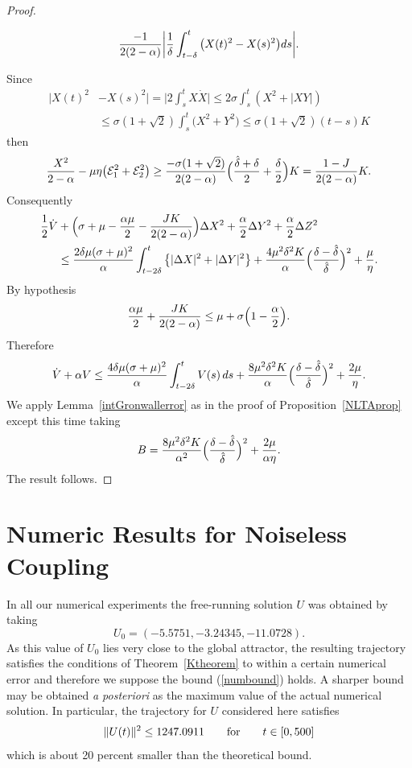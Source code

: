 \documentclass[master,tocprelim,12pt]{unrthesis}
\theoremstyle{definition}
\newcommand{\yourdelta}{{\Delta}}
\numberwithin{equation}{chapter}
\begin{document}
\begin{manuscript}
\begin{proof}
\begin{plain}
$${	{-1\over 2(2-\alpha)}
		\bigg| {1\over \delta}
			\int_{t-\delta}^t
				\big(X(t)^2-X(s)^2\big)ds\bigg|.
}$$\end{plain}%
Since 
\begin{align*}
	|X(t)^2&-X(s)^2|=\Big|2\int_s^t X\dot X\Big|
	\le 2\sigma \int_s^t (X^2+ |XY|)\\
	&
	\le \sigma (1+\sqrt 2)\int_s^t \big(X^2+ Y^2\big)
	\le \sigma (1+\sqrt 2)(t-s)K
\end{align*}
then
$$
	{X^2\over 2-\alpha}-\mu\eta
        \big({\cal E}_1^2+{\cal E}_2^2\big)
	\ge{-\sigma(1+\sqrt 2)\over 2(2-\alpha)}
    \Big({\hat\delta+\delta\over 2}+{\delta\over 2}\Big)K
	={1-J\over 2(2-\alpha)}K.
$$
Consequently
\begin{align*}
{1 \over 2}\dot{V} &+
    \Big(\sigma + \mu
        -{\alpha\mu\over 2}
	-
        {JK\over 2(2-\alpha)}
    \Big)
	\yourdelta X^2 
	+ {\alpha\over 2}\yourdelta Y^2 +
    {\alpha\over 2}\yourdelta Z^2\\
    &\le
         {2\delta\mu (\sigma + \mu)^2\over \alpha}
        \int_{t-2\delta}^t
        \big\{|\yourdelta X|^2 + |\yourdelta Y|^2\big\}
		+{4\mu^2\delta^2K\over\alpha}
			\Big({\delta-\hat\delta\over\hat\delta}\Big)^2
+{\mu\over\eta}.
\end{align*}
By hypothesis
$$
	{\alpha\mu\over 2}
    +
        {JK\over 2(2-\alpha)}
	\le
		\mu+\sigma \Big(1-{\alpha\over 2}\Big).
$$
Therefore
\begin{align*}
    \dot V
+ \alpha V
    \leq
        {4\delta\mu (\sigma + \mu)^2\over \alpha}
        \int_{t-2\delta}^t V(s)\,ds
		+{8\mu^2\delta^2K\over\alpha}
			\Big({\delta-\hat\delta\over\hat\delta}\Big)^2
+{2\mu\over\eta}.
\end{align*}
We apply Lemma~\ref{intGronwallerror} as in the proof
of Proposition~\ref{NLTAprop} except this time 
taking 
$$B=
		{8\mu^2\delta^2K\over\alpha^2}
			\Big({\delta-\hat\delta\over\hat\delta}\Big)^2
+{2\mu\over \alpha\eta}
.$$  The result follows.
\end{proof}


\section{Numeric Results for Noiseless Coupling}\label{NoiselessComp}

In all our numerical experiments the free-running solution 
$U$ was obtained by taking 
$$U_0=(-5.5751, -3.24345, -11.0728).$$
As this value of $U_0$ lies very close to the global attractor,
the resulting trajectory
satisfies the conditions of Theorem~\ref{Ktheorem}
to within a certain numerical error and therefore 
we suppose the bound (\ref{numbound}) holds.
A sharper bound may be obtained {\it a posteriori\/} 
as the maximum value of the actual numerical solution.  
In particular, the trajectory for $U$
considered here satisfies
\begin{equation}\label{numbound}
	\|U(t)\|^2\le 1247.0911\qquad\hbox{for}\qquad t\in [0,500]
\end{equation}
which is about 20 percent smaller than the theoretical 
bound.


\end{manuscript}
\end{document}

